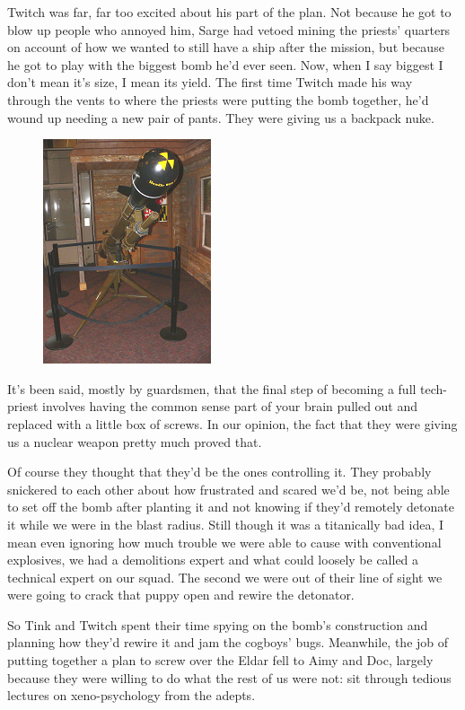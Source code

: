 Twitch was far, far too excited about his part of the plan. 
Not because he got to blow up people who annoyed him, Sarge had vetoed mining the priests' quarters on account of how we wanted to still have a ship after the mission, but because he got to play with the biggest bomb he'd ever seen. 
Now, when I say biggest I don't mean it's size, I mean its yield. 
The first time Twitch made his way through the vents to where the priests were putting the bomb together, he'd wound up needing a new pair of pants. 
They were giving us a backpack nuke.

\begin{figure}
	\begin{center}
		\includegraphics[width=\figwidth]{pics/11/70.png}
	\end{center}
\end{figure}
It's been said, mostly by guardsmen, that the final step of becoming a full tech-priest involves having the common sense part of your brain pulled out and replaced with a little box of screws. 
In our opinion, the fact that they were giving us a nuclear weapon pretty much proved that.

Of course they thought that they'd be the ones controlling it. 
They probably snickered to each other about how frustrated and scared we'd be, not being able to set off the bomb after planting it and not knowing if they'd remotely detonate it while we were in the blast radius. 
Still though it was a titanically bad idea, I mean even ignoring how much trouble we were able to cause with conventional explosives, we had a demolitions expert and what could loosely be called a technical expert on our squad. 
The second we were out of their line of sight we were going to crack that puppy open and rewire the detonator.

So Tink and Twitch spent their time spying on the bomb's construction and planning how they'd rewire it and jam the cogboys' bugs. 
Meanwhile, the job of putting together a plan to screw over the Eldar fell to Aimy and Doc, largely because they were willing to do what the rest of us were not: 
sit through tedious lectures on xeno-psychology from the adepts. 


